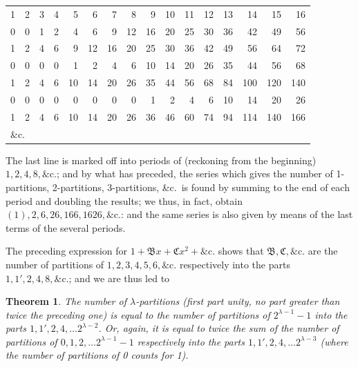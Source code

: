 \documentclass[12pt,a4paper]{article}
\theoremstyle{plain}
\newtheorem*{theorem*}{Theorem}
\begin{document}
\medskip

\begin{center}
\renewcommand{\arraystretch}{1.15}
\begin{tabular}{r r r r r r r r r r r r r r r r}
1 & 2 & 3 & 4 & 5 & 6 & 7 & 8 & 9 & 10 & 11 & 12 & 13 & 14 & 15 & 16\\
0 & 0 & 1 & 2 & 4 & 6 & 9 & 12 & 16 & 20 & 25 & 30 & 36 & 42 & 49 & 56\\
\hline
1 & 2 & 4 & 6 & 9 & 12 & 16 & 20 & 25 & 30 & 36 & 42 & 49 & 56 & 64 & 72\\
0 & 0 & 0 & 0 & 1 & 2 & 4 & 6 & 10 & 14 & 20 & 26 & 35 & 44 & 56 & 68\\
\hline
1 & 2 & 4 & 6 & 10 & 14 & 20 & 26 & 35 & 44 & 56 & 68 & 84 & 100 & 120 & 140\\
0 & 0 & 0 & 0 & 0 & 0 & 0 & 0 & 1 & 2 & 4 & 6 & 10 & 14 & 20 & 26\\
\hline
1 & 2 & 4 & 6 & 10 & 14 & 20 & 26 & 36 & 46 & 60 & 74 & 94 & 114 & 140 & 166\\
\multicolumn{16}{l}{\&c.}
\end{tabular}
\end{center}

\medskip

The last line is marked off into periods of (reckoning from the beginning) $1,2,4,8,\&\mathrm{c}.$; and by what has preceded, the series which gives the number of 1-partitions, 2-partitions, 3-partitions, \&c.\ is found by summing to the end of each period and doubling the results; we thus, in fact, obtain $(1),2,6,26,166,1626,\&\mathrm{c}.$: and the same series is also given by means of the last terms of the several periods.

\medskip

The preceding expression for $1+\mathfrak{B}x+\mathfrak{C}x^2+\&\mathrm{c}.$ shows that $\mathfrak{B},\mathfrak{C},\&\mathrm{c}.$ are the number of partitions of $1,2,3,4,5,6,\&\mathrm{c}.$ respectively into the parts $1,1',2,4,8,\&\mathrm{c}.$; and we are thus led to

\begin{theorem*}
The number of $\lambda$-partitions (first part unity, no part greater than twice the preceding one) is equal to the number of partitions of $2^{\lambda-1}-1$ into the parts $1,1',2,4,\ldots 2^{\lambda-2}$. Or, again, it is equal to twice the sum of the number of partitions of $0,1,2,\ldots 2^{\lambda-1}-1$ respectively into the parts $1,1',2,4,\ldots 2^{\lambda-3}$ (where the number of partitions of 0 counts for 1).
\end{theorem*}
\end{document}
